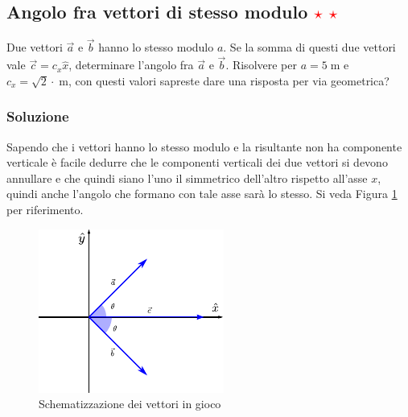 \documentclass[12pt,a4paper]{book}
\newcommand{\rstar}{ \textcolor{red}{$\star$}}
\begin{document}
\subsection{Angolo fra vettori di stesso modulo \rstar\rstar}
Due vettori $\vec{a}$ e $\vec{b}$ hanno lo stesso modulo $a$. Se la somma di questi due vettori vale $\vec{c}=c_x\hat{x}$, determinare l'angolo fra $\vec{a}$ e $\vec{b}$. Risolvere per $a=5\;\text{m}$ e $c_x=\sqrt{2}\cdot\;\text{m}$, con questi valori sapreste dare una risposta per via geometrica?

\subsubsection*{Soluzione}
Sapendo che i vettori hanno lo stesso modulo e la risultante non ha componente verticale è facile dedurre che le componenti verticali dei due vettori si devono annullare e che quindi siano l'uno il simmetrico dell'altro rispetto all'asse $x$, quindi anche l'angolo che formano con tale asse sarà lo stesso. Si veda Figura \ref{fig:vec_ang} per riferimento.

\begin{figure}[h]
 \centering
\includegraphics[scale=2.0]{vec_ang.pdf}
 \caption{Schematizzazione dei vettori in gioco}
 \label{fig:vec_ang}
\end{figure}
\end{document}
